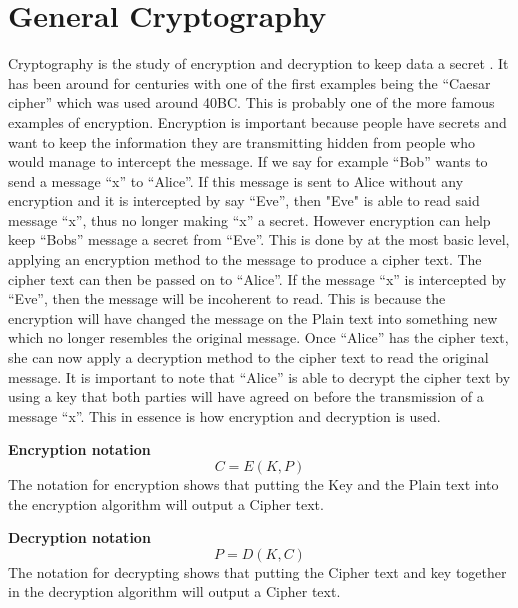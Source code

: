 \documentclass[11pt,a4paper]{report}
\begin{document}
\section{General Cryptography}
\label{sec:GenCrypt}
Cryptography is the study of encryption and decryption to keep data a secret \cite{DBLP:series/isc/DelfsK07}. It has been around for centuries with one of the first examples being the “Caesar cipher” which was used around 40BC. This is probably one of the more famous examples of encryption.
Encryption is important because people have secrets and want to keep the information they are transmitting hidden from people who would manage to intercept the message. If we say for example “Bob” wants to send a message “x” to “Alice”. If this message is sent to Alice without any encryption and it is intercepted by say “Eve”, then "Eve" is able to read said message “x”, thus no longer making “x” a secret. However encryption can help keep “Bobs” message a secret from “Eve”. This is done by at the most basic level, applying an encryption method to the message to produce a cipher text. The cipher text can then be passed on to “Alice”. If the message “x” is intercepted by “Eve”, then the message will be incoherent to read. This is because the encryption will have changed the message on the Plain text into something new which no longer resembles the original message. Once “Alice” has the cipher text, she can now apply a decryption method to the cipher text to read the original message. It is important to note that “Alice” is able to decrypt the cipher text by using a key that both parties will have agreed on before the transmission of a message “x”. This in essence is how encryption and decryption is used. 

\textbf{Encryption notation}
\begin{displaymath}
C = E (K, P)
\end{displaymath}
The notation for encryption shows that putting the Key and the Plain text into the encryption algorithm will output a Cipher text.

\textbf{Decryption notation}
\begin{displaymath}
P = D (K, C)
\end{displaymath}
The notation for decrypting shows that putting the Cipher text and key together in the decryption algorithm will output a Cipher text.
\end{document}
